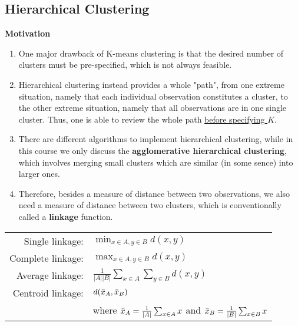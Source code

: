 \documentclass[12pt]{extarticle}
\newcommand{\<}{\langle}
\renewcommand{\>}{\rangle}
\theoremstyle{definition}
\begin{document}
\subsection{Hierarchical Clustering}
\textbf{Motivation}
\begin{enumerate}
    \item One major drawback of K-means clustering is that the desired number of clusters must be pre-specified, which is not always feasible.
    \item Hierarchical clustering instead provides a whole "path", from one extreme situation, namely that each individual observation constitutes a cluster, to the other extreme situation, namely that all observations are in one single cluster. Thus, one is able to review the whole path \underline{before specifying $K$}.
    \item There are different algorithms to implement hierarchical clustering, while in this course we only discuss the \textbf{agglomerative hierarchical clustering}, which involves merging small clusters which are similar (in some sence) into larger ones.
    \item Therefore, besides a measure of distance between two observations, we also need a measure of distance between two clusters, which is conventionally called a \textbf{linkage} function.
\end{enumerate}

\begin{tcolorbox}[enhanced, drop fuzzy shadow, title=Linkage functions (No need to memorize)]
\renewcommand{\arraystretch}{2}
\begin{tabular}{rl}
Single linkage:& $\min_{x\in A, y\in B} d(x,y)$\\
Complete linkage:& $\max_{x\in A, y\in B}d(x,y)$\\
Average linkage:& $\frac{1}{|A||B|}\sum_{x\in A}\sum_{y\in B}d(x,y)$\\
Centroid linkage:& $d(\Bar{x}_A,\Bar{x}_B)$\\
& where $\Bar{x}_A=\frac{1}{|A|}\sum_{x\in A}x$ and $\Bar{x}_B=\frac{1}{|B|}\sum_{x\in B}x$
\end{tabular}
\end{tcolorbox}
\end{document}
